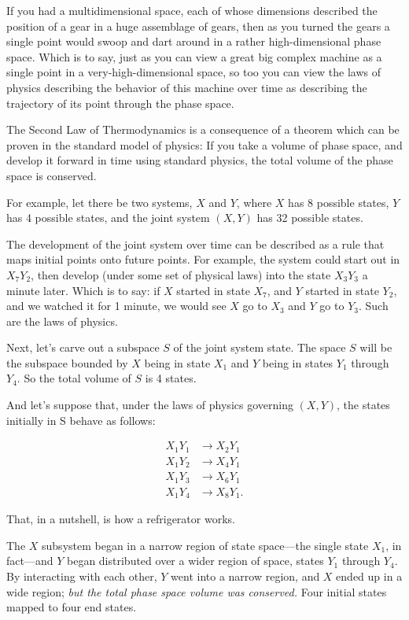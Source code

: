{
 If you had a multidimensional space, each of whose dimensions
described the position of a gear in a huge assemblage of gears, then as
you turned the gears a single point would swoop and dart around in a
rather high-dimensional phase space. Which is to say, just as you can
view a great big complex machine as a single point in a
very-high-dimensional space, so too you can view the laws of physics
describing the behavior of this machine over time as describing the
trajectory of its point through the phase space.}

{
 The Second Law of Thermodynamics is a consequence of a theorem
which can be proven in the standard model of physics: If you take a
volume of phase space, and develop it forward in time using standard
physics, the total volume of the phase space is conserved.}

{
 For example, let there be two systems, $X$ and $Y$, where $X$ has 8
possible states, $Y$ has 4 possible states, and the joint system $(X,Y)$
has 32 possible states.}

{
 The development of the joint system over time can be described as
a rule that maps initial points onto future points. For example, the
system could start out in $X_{7}Y_{2}$, then
develop (under some set of physical laws) into the state
$X_{3}Y_{3}$ a minute later. Which is to say:
if $X$ started in state $X_{7}$, and $Y$ started in state
$Y_{2}$, and we watched it for 1 minute, we would see $X$ go
to $X_{3}$ and $Y$ go to $Y_{3}$. Such are the laws
of physics.}

{
 Next, let's carve out a subspace $S$ of the joint
system state. The space $S$ will be the subspace bounded by $X$ being in
state $X_{1}$ and $Y$ being in states $Y_{1}$
through $Y_{4}$. So the total volume of $S$ is 4 states.}

{
 And let's suppose that, under the laws of physics
governing $(X,Y)$, the states initially in S behave as follows:}


\begin{align*}
 X_{1}Y_{1} &\rightarrow X_{2}Y_{1} \\
 X_{1}Y_{2} &\rightarrow X_{4}Y_{1} \\
 X_{1}Y_{3} &\rightarrow X_{6}Y_{1} \\
 X_{1}Y_{4} &\rightarrow X_{8}Y_{1}.
\end{align*}

{
 That, in a nutshell, is how a refrigerator works.}

{
 The $X$ subsystem began in a narrow region of state space---the
single state $X_{1}$, in fact---and $Y$ began distributed over
a wider region of space, states $Y_{1}$ through
$Y_{4}$. By interacting with each other, $Y$ went into a
narrow region, and $X$ ended up in a wide region; \textit{but the total
phase space volume was conserved.} Four initial states mapped to four
end states.}

